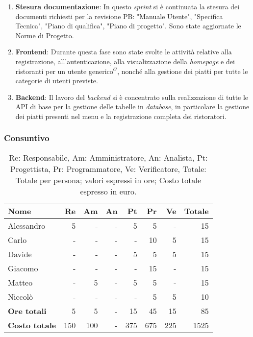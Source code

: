 \begin{enumerate}
	\item \textbf{Stesura documentazione}: In questo \textit{sprint} si è continuata la stesura dei documenti richiesti per la revisione PB: "Manuale Utente", "Specifica Tecnica", "Piano di qualifica", "Piano di progetto". Sono state aggiornate le Norme di Progetto.

	\item \textbf{Frontend}: Durante questa fase sono state svolte le attività relative alla registrazione, all'autenticazione, alla visualizzazione della \textit{homepage} e dei ristoranti per un utente generico$^G$, nonché alla gestione dei piatti per tutte le categorie di utenti previste.

	\item \textbf{Backend}: Il lavoro del \textit{backend} si è concentrato sulla realizzazione di tutte le API di base per la gestione delle tabelle in \textit{database}, in particolare la gestione dei piatti presenti nel menu e la registrazione completa dei ristoratori.
\end{enumerate}

\subsubsection{Consuntivo}
\begin{table}[H]
	\centering
	\begin{tabular}{l|r|r|r|r|r|r|r}
		\textbf{Nome}         & \textbf{Re} & \textbf{Am} & \textbf{An} & \textbf{Pt} & \textbf{Pr} & \textbf{Ve} & \textbf{Totale} \\
		\hline
		Alessandro            & 5           & -           & -           & 5           & 5           & -           & 15              \\
		Carlo                 & -           & -           & -           & -           & 10           & 5           & 15              \\
		Davide                & -           & -           & -           & 5           & 5           & 5           & 15              \\
		Giacomo               & -           & -           & -           & -           & 15          	& -           & 15              \\
		Matteo                & -           & 5           & -           & 5           & 5           & -           & 15              \\
		Niccolò               & -           & -           & -           & -           & 5           & 5           & 10              \\
		\hline
		\textbf{Ore totali}   & 5           & 5           & -           & 15          & 45          & 15          & 85              \\
		\textbf{Costo totale} & 150         & 100         & -           & 375         & 675         & 225         & 1525
	\end{tabular}
	\caption{Re: Responsabile, Am: Amministratore, An: Analista, Pt: Progettista,
		Pr: Programmatore, Ve: Verificatore, Totale: Totale per persona; valori espressi in ore; Costo totale espresso in euro.}
\end{table}

